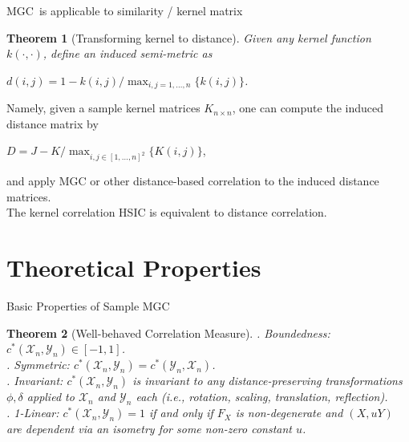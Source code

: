 \documentclass[mathserif,t]{beamer}
\newtheorem{thm}{Theorem}
\newcommand{\Mgc}{MGC}
\begin{document}
\begin{frame}{\Mgc~is applicable to similarity / kernel matrix}
\begin{thm}[Transforming kernel to distance]
Given any kernel function $k(\cdot,\cdot)$, define an induced semi-metric as 
\begin{center}
$d(i,j)=1-k(i,j) / \max_{i,j=1,\ldots,n}\{k(i,j)\}$.
\end{center}
\end{thm}
\pause
\medskip
Namely, given a sample kernel matrices $K_{n \times n}$, one can compute the induced distance matrix by 
\begin{center}
$D=J-K/\max_{i,j \in [1,\ldots,n]^2}\{K(i,j)\}$,
\end{center}
and apply MGC or other distance-based correlation to the induced distance matrices.\\
\pause
\medskip
The kernel correlation HSIC is equivalent to distance correlation. 
\end{frame}





\section{Theoretical Properties}
\begin{frame}{Basic Properties of Sample \Mgc}
\begin{thm}[Well-behaved Correlation Measure]
. Boundedness: $c^{*}(\mathcal{X}_{n},\mathcal{Y}_{n}) \in [-1,1]$.\\
\pause
{}. Symmetric: $c^{*}(\mathcal{X}_{n},\mathcal{Y}_{n}) =c^{*}(\mathcal{Y}_{n},\mathcal{X}_{n})$.\\
\pause
{}. Invariant: $c^{*}(\mathcal{X}_{n},\mathcal{Y}_{n})$ is invariant to any distance-preserving transformations $\phi,\delta$ applied to $\mathcal{X}_{n}$ and $\mathcal{Y}_{n}$ each (i.e., rotation, scaling, translation, reflection).\\
\pause
{}. 1-Linear: $c^{*}(\mathcal{X}_{n},\mathcal{Y}_{n})=1$ if and only if $F_{X}$ is non-degenerate and $(X, u Y)$ are dependent via an isometry for some non-zero constant $u$.\\
\end{thm}
\end{frame}
\end{document}
